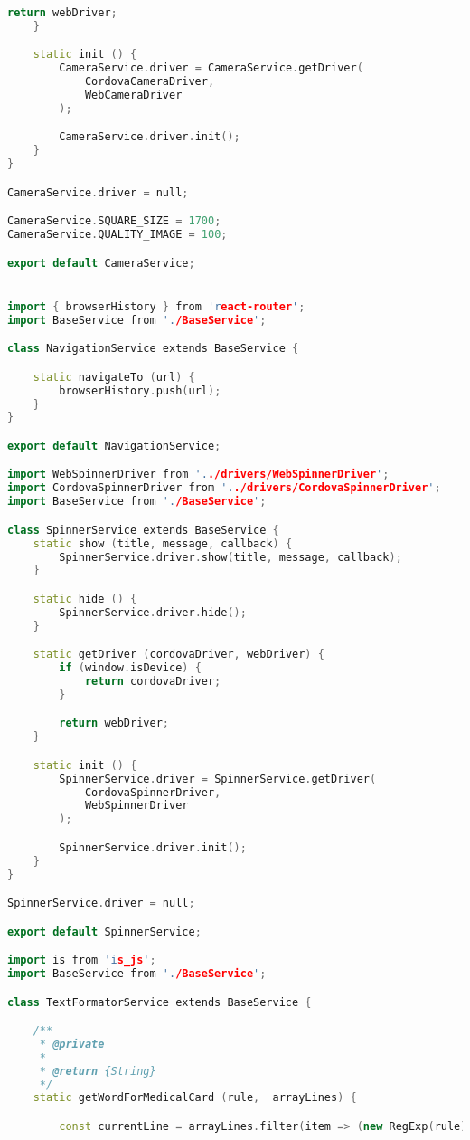 \begin{lstlisting}[language=C++, style=cplusplusstyle]
        return webDriver;
    }

    static init () {
        CameraService.driver = CameraService.getDriver(
            CordovaCameraDriver,
            WebCameraDriver
        );

        CameraService.driver.init();
    }
}

CameraService.driver = null;

CameraService.SQUARE_SIZE = 1700;
CameraService.QUALITY_IMAGE = 100;

export default CameraService;


import { browserHistory } from 'react-router';
import BaseService from './BaseService';

class NavigationService extends BaseService {

    static navigateTo (url) {
        browserHistory.push(url);
    }
}

export default NavigationService;

import WebSpinnerDriver from '../drivers/WebSpinnerDriver';
import CordovaSpinnerDriver from '../drivers/CordovaSpinnerDriver';
import BaseService from './BaseService';

class SpinnerService extends BaseService {
    static show (title, message, callback) {
        SpinnerService.driver.show(title, message, callback);
    }

    static hide () {
        SpinnerService.driver.hide();
    }

    static getDriver (cordovaDriver, webDriver) {
        if (window.isDevice) {
            return cordovaDriver;
        }

        return webDriver;
    }

    static init () {
        SpinnerService.driver = SpinnerService.getDriver(
            CordovaSpinnerDriver,
            WebSpinnerDriver
        );

        SpinnerService.driver.init();
    }
}

SpinnerService.driver = null;

export default SpinnerService;

import is from 'is_js';
import BaseService from './BaseService';

class TextFormatorService extends BaseService {

    /**
     * @private
     *
     * @return {String}
     */
    static getWordForMedicalCard (rule,  arrayLines) {

        const currentLine = arrayLines.filter(item => (new RegExp(rule)).test(item.text));


\end{lstlisting}

